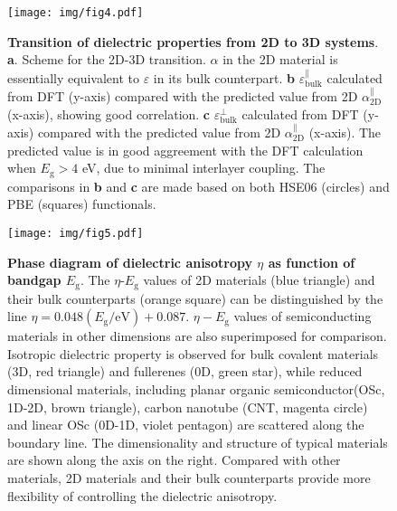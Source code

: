 \documentclass[journal=ancac3,manuscript=article,email=true,hyperref=true,keywords=false]{achemso}
\begin{document}
\begin{figure}[H]
\centering
\texttt{[image: img/fig4.pdf]}
\caption{\label{fig-4} \textbf{Transition of dielectric properties
    from 2D to 3D systems}. \textbf{a}. Scheme for the 2D-3D
  transition. $\alpha$ in the 2D material is essentially equivalent to
  $\varepsilon$ in its bulk counterpart. \textbf{b}
  $\varepsilon_{\mathrm{bulk}}^{\parallel}$ calculated from DFT
  (y-axis) compared with the predicted value from 2D
  $\alpha_{\mathrm{2D}}^{\parallel}$ (x-axis), showing good correlation. \textbf{c}
  $\varepsilon_{\mathrm{bulk}}^{\perp}$ calculated from DFT (y-axis)
  compared with the predicted value from 2D $\alpha_{\mathrm{2D}}^{\parallel}$
  (x-axis). The predicted value is in good aggreement with the DFT
  calculation when $E_{\mathrm{g}}>4$ eV, due to minimal interlayer
  coupling. The comparisons in \textbf{b} and \textbf{c} are made
  based on both HSE06 (circles) and PBE (squares) functionals.}
\end{figure}

\begin{figure}[H]
  \centering
  \texttt{[image: img/fig5.pdf]}
  \caption{\textbf{Phase diagram of dielectric anisotropy $\eta$ as
      function of bandgap $E_{\mathrm{g}}$}. The
    $\eta$-$E_{\mathrm{g}}$ values of 2D materials (blue triangle) and
    their bulk counterparts (orange square) can be distinguished by
    the line $\eta=0.048(E_{\mathrm{g}}/\mathrm{eV})+0.087$. $\eta-E_{\mathrm{g}}$ values of
    semiconducting materials in other dimensions are also superimposed
    for comparison. Isotropic dielectric property is observed for bulk
    covalent materials (3D, red triangle) and fullerenes (0D, green
    star), while reduced dimensional materials, including planar
    organic semiconductor(OSc, 1D-2D, brown triangle), carbon nanotube
    (CNT, magenta circle) and linear OSc (0D-1D, violet pentagon) are
    scattered along the boundary line. The dimensionality and
    structure of typical materials are shown along the axis on the
    right. Compared with other materials, 2D materials and their bulk
    counterparts provide more flexibility of controlling the
    dielectric anisotropy.}
  \label{fig:aniso}
\end{figure}
\end{document}

